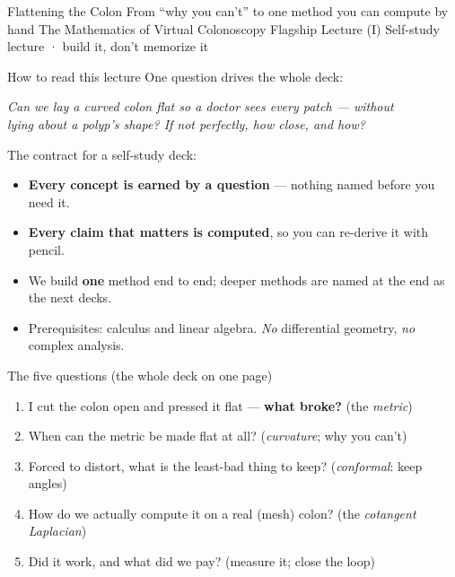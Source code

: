 \documentclass[aspectratio=169,10pt]{beamer}
\begin{document}
\TLtitlecenter
  {Flattening the Colon}
  {From ``why you can't'' to one method you can compute by hand}
  {The Mathematics of Virtual Colonoscopy \textperiodcentered{} Flagship Lecture (I)}
  {Self-study lecture · build it, don't memorize it}

\begin{frame}{How to read this lecture}
  One question drives the whole deck:
  \begin{center}
    \emph{Can we lay a curved colon flat so a doctor sees every patch --- without\\
    lying about a polyp's shape? If not perfectly, how close, and how?}
  \end{center}
  The contract for a self-study deck:
  \begin{itemize}
    \item \textbf{Every concept is earned by a question} --- nothing named before you need it.
    \item \textbf{Every claim that matters is computed}, so you can re-derive it with pencil.
    \item We build \textbf{one} method end to end; deeper methods are named at the end as the next decks.
    \item Prerequisites: calculus and linear algebra. \emph{No} differential geometry, \emph{no} complex analysis.
  \end{itemize}
\end{frame}

\begin{frame}{The five questions (the whole deck on one page)}
  \begin{enumerate}
    \item[\textbf{Q1}] I cut the colon open and pressed it flat --- \textbf{what broke?} \hfill (the \emph{metric})
    \item[\textbf{Q2}] When can the metric be made flat at all? \hfill (\emph{curvature}; why you can't)
    \item[\textbf{Q3}] Forced to distort, what is the least-bad thing to keep? \hfill (\emph{conformal}: keep angles)
    \item[\textbf{Q4}] How do we actually compute it on a real (mesh) colon? \hfill (the \emph{cotangent Laplacian})
    \item[\textbf{Q5}] Did it work, and what did we pay? \hfill (measure it; close the loop)
  \end{enumerate}
\end{frame}
\end{document}

